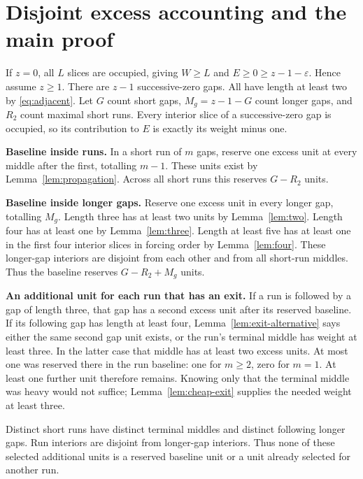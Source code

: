 \documentclass{article}
\begin{document}
\section{Disjoint excess accounting and the main proof}\label{sec:accounting}

If \(z = 0\), all \(L\) slices are occupied, giving \(W \ge L\) and
\(E \ge 0 \ge z - 1 - \varepsilon\). Hence assume \(z \ge 1\). There are \(z - 1\)
successive-zero gaps. All have length at least two by \eqref{eq:adjacent}. Let \(G\) count short
gaps, \(M_g = z - 1 - G\) count longer gaps, and \(R_2\) count maximal short runs. Every interior
slice of a successive-zero gap is occupied, so its contribution to \(E\) is exactly its weight
minus one.

\textbf{Baseline inside runs.} In a short run of \(m\) gaps, reserve one excess unit at every
middle after the first, totalling \(m - 1\). These units exist by Lemma~\ref{lem:propagation}.
Across all short runs this reserves \(G - R_2\) units.

\textbf{Baseline inside longer gaps.} Reserve one excess unit in every longer gap, totalling
\(M_g\). Length three has at least two units by Lemma~\ref{lem:two}. Length four has at least one
by Lemma~\ref{lem:three}. Length at least five has at least one in the first four interior slices
in forcing order by Lemma~\ref{lem:four}. These longer-gap interiors are disjoint from each other
and from all short-run middles. Thus the baseline reserves \(G - R_2 + M_g\) units.

\textbf{An additional unit for each run that has an exit.} If a run is followed by a gap of length
three, that gap has a second excess unit after its reserved baseline. If its following gap has
length at least four, Lemma~\ref{lem:exit-alternative} says either the same second gap unit
exists, or the run's terminal middle has weight at least three. In the latter case that middle
has at least two excess units. At most one was reserved there in the run baseline: one for
\(m \ge 2\), zero for \(m = 1\). At least one further unit therefore remains. Knowing only that
the terminal middle was heavy would not suffice; Lemma~\ref{lem:cheap-exit} supplies the needed
weight at least three.

Distinct short runs have distinct terminal middles and distinct following longer gaps. Run
interiors are disjoint from longer-gap interiors. Thus none of these selected additional units is
a reserved baseline unit or a unit already selected for another run.
\end{document}
